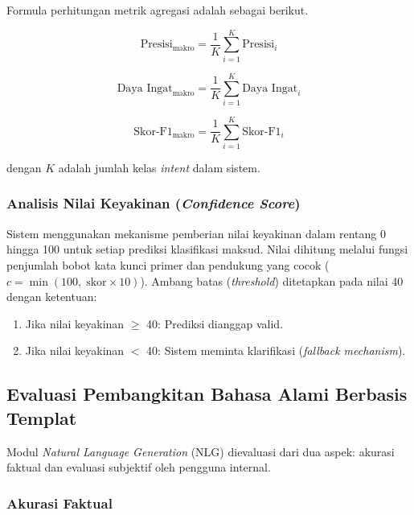 Formula perhitungan metrik agregasi adalah sebagai berikut.

\begin{equation}
\label{sym:K}
\text{Presisi}_{\text{makro}} = \frac{1}{K} \sum_{i=1}^{K} \text{Presisi}_i
\end{equation}

\begin{equation}
\text{Daya Ingat}_{\text{makro}} = \frac{1}{K} \sum_{i=1}^{K} \text{Daya Ingat}_i
\end{equation}

\begin{equation}
\text{Skor-F1}_{\text{makro}} = \frac{1}{K} \sum_{i=1}^{K} \text{Skor-F1}_i
\end{equation}

dengan $K$ adalah jumlah kelas \textit{intent} dalam sistem.

\subsubsection{Analisis Nilai Keyakinan (\textit{Confidence Score})}

Sistem menggunakan mekanisme pemberian nilai keyakinan dalam rentang 0 hingga 100 untuk setiap prediksi klasifikasi maksud. Nilai dihitung melalui fungsi penjumlah bobot kata kunci primer dan pendukung yang cocok ($c = \min(100,\;\text{skor} \times 10)$). Ambang batas (\textit{threshold}) ditetapkan pada nilai 40 dengan ketentuan:
\begin{enumerate}
    \item Jika nilai keyakinan $\geq$ 40: Prediksi dianggap valid.
    \item Jika nilai keyakinan $<$ 40: Sistem meminta klarifikasi (\textit{fallback mechanism}).
\end{enumerate}

\subsection{Evaluasi Pembangkitan Bahasa Alami Berbasis Templat}
\label{subsec:eval-nlg}

Modul \textit{Natural Language Generation} (NLG) dievaluasi dari dua aspek: akurasi faktual dan evaluasi subjektif oleh pengguna internal.

\subsubsection{Akurasi Faktual}

